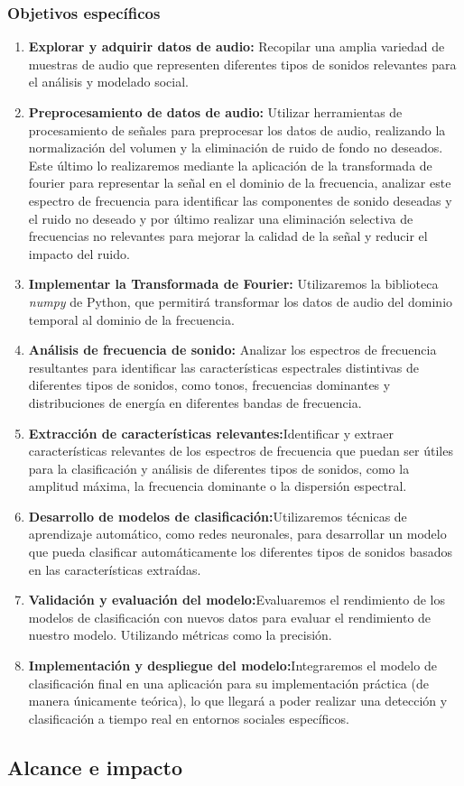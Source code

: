 \subsubsection{Objetivos específicos}
\begin{enumerate}
    \item \textbf{Explorar y adquirir datos de audio:} Recopilar una amplia variedad de muestras de audio que representen diferentes tipos de sonidos relevantes para el análisis y modelado social.
    \item \textbf{Preprocesamiento de datos de audio:} Utilizar herramientas de procesamiento de señales para preprocesar los datos de audio, realizando la normalización del volumen y la eliminación de ruido de fondo no deseados. Este último lo realizaremos mediante la aplicación de la transformada de fourier para representar la señal en el dominio de la frecuencia, analizar este espectro de frecuencia para identificar las componentes de sonido deseadas y el ruido no deseado y por último realizar una eliminación selectiva de frecuencias no relevantes para mejorar la calidad de la señal y reducir el impacto del ruido.
    \item \textbf{Implementar la Transformada de Fourier:} Utilizaremos la biblioteca \textit{numpy} de Python, que permitirá transformar los datos de audio del dominio temporal al dominio de la frecuencia.
    \item \textbf{Análisis de frecuencia de sonido:} Analizar los espectros de frecuencia resultantes para identificar las características espectrales distintivas de diferentes tipos de sonidos, como tonos, frecuencias dominantes y distribuciones de energía en diferentes bandas de frecuencia.
    \item \textbf{Extracción de características relevantes:}Identificar y extraer características relevantes de los espectros de frecuencia que puedan ser útiles para la clasificación y análisis de diferentes tipos de sonidos, como la amplitud máxima, la frecuencia dominante o  la dispersión espectral.
    \item \textbf{Desarrollo de modelos de clasificación:}Utilizaremos técnicas de aprendizaje automático, como redes neuronales, para desarrollar un modelo que pueda clasificar automáticamente los diferentes tipos de sonidos basados en las características extraídas.
    \item \textbf{Validación y evaluación del modelo:}Evaluaremos el rendimiento de los modelos de clasificación con nuevos datos para evaluar el rendimiento de nuestro modelo.  Utilizando métricas como la precisión.
    \item \textbf{Implementación y despliegue del modelo:}Integraremos el modelo de clasificación final en una aplicación para su implementación práctica (de manera únicamente teórica), lo que llegará a poder realizar una detección y clasificación a tiempo real en entornos sociales específicos.
\end{enumerate}
\subsection{Alcance e impacto}

